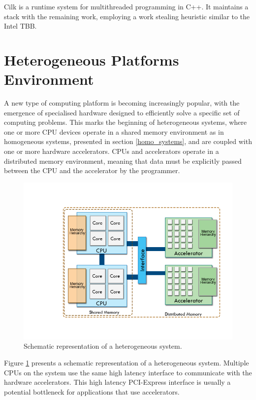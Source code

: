 Cilk is a runtime system for multithreaded programming in C++. It maintains a stack with the remaining work, employing a work stealing heuristic similar to the Intel TBB.

\section{Heterogeneous Platforms Environment}
\label{hetero_systems}

A new type of computing platform is becoming increasingly popular, with the emergence of specialised hardware designed to efficiently solve a specific set of computing problems. This marks the beginning of heterogeneous systems, where one or more CPU devices operate in a shared memory environment as in homogeneous systems, presented in section \ref{homo_systems}, and are coupled with one or more hardware accelerators. CPUs and accelerators operate in a distributed memory environment, meaning that data must be explicitly passed between the CPU and the accelerator by the programmer.

\begin{figure}[!htp]
	\begin{center}
		\includegraphics[scale=0.45]{imgs/heteroplats.png}
		\caption{Schematic representation of a heterogeneous system.}
		\label{fig:heteroplat}
	\end{center}
\end{figure}

Figure \ref{fig:heteroplat} presents a schematic representation of a heterogeneous system. Multiple CPUs on the system use the same high latency interface to communicate with the hardware accelerators. This high latency PCI-Express interface is usually a potential bottleneck for applications that use accelerators.

